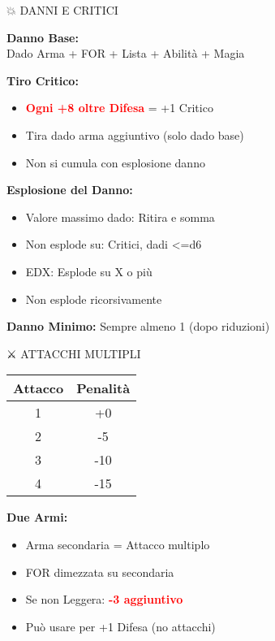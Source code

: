 \documentclass[10pt,a4paper,landscape]{article}
\newcommand{\critical}[1]{\textcolor{red}{\textbf{#1}}}
\begin{document}
\begin{multicols}{4}
		\columnbreak
		
		\begin{mainsection}{💥 DANNI E CRITICI}
			\begin{formula}
				\textbf{Danno Base:}\\
				Dado Arma + FOR + Lista + Abilità + Magia
			\end{formula}
			
			\textbf{Tiro Critico:}
			\begin{itemize}[noitemsep,leftmargin=8pt]
				\item \critical{Ogni +8 oltre Difesa} = +1 Critico
				\item Tira dado arma aggiuntivo (solo dado base)
				\item Non si cumula con esplosione danno
			\end{itemize}
			
			\textbf{Esplosione del Danno:}
			\begin{itemize}[noitemsep,leftmargin=8pt]
				\item Valore massimo dado: Ritira e somma
				\item Non esplode su: Critici, dadi <=d6
				\item EDX: Esplode su X o più
				\item Non esplode ricorsivamente
			\end{itemize}
			
			\textbf{Danno Minimo:} Sempre almeno 1 (dopo riduzioni)
		\end{mainsection}
		
		\begin{mainsection}{⚔️ ATTACCHI MULTIPLI}
			\begin{tabular}{@{}cc@{}}
				\toprule
				\textbf{Attacco} & \textbf{Penalità} \\
				\midrule
				1 & +0 \\
				2 & -5 \\
				3 & -10 \\
				4 & -15 \\
				\bottomrule
			\end{tabular}
			
			\textbf{Due Armi:}
			\begin{itemize}[noitemsep,leftmargin=8pt]
				\item Arma secondaria = Attacco multiplo
				\item FOR dimezzata su secondaria
				\item Se non Leggera: \critical{-3 aggiuntivo}
				\item Può usare per +1 Difesa (no attacchi)
			\end{itemize}
			

\end{mainsection}
\end{multicols}
\end{document}
